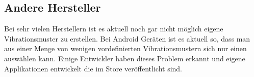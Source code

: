 \subsection{Andere Hersteller}
\label{ch:Grundlagen:sec:RelatedWork:subsec:PersonalisierteSmartwatch}
Bei sehr vielen Herstellern ist es aktuell noch gar nicht m{\"o}glich eigene Vibrationsmuster zu erstellen. 
Bei Android Ger{\"a}ten ist es aktuell so, dass man aus einer Menge von wenigen vordefinierten Vibrationsmustern sich nur einen ausw{\"a}hlen kann. 
Einige Entwickler haben dieses Problem erkannt und eigene Applikationen entwickelt die im Store ver{\"o}ffentlicht sind.





